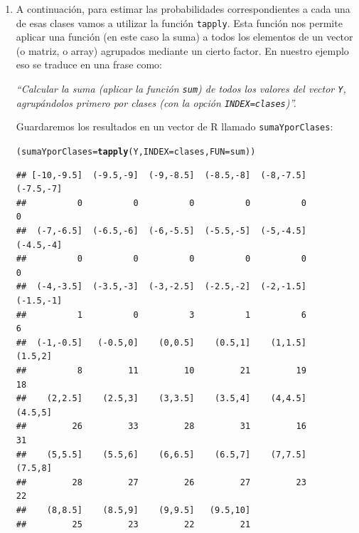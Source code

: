 \documentclass[10pt,a4paper]{article}\usepackage[]{graphicx}\usepackage[]{color}
\makeatletter
\newcommand{\hlstd}[1]{\textcolor[rgb]{0.345,0.345,0.345}{#1}}%
\newcommand{\hlkwb}[1]{\textcolor[rgb]{0.69,0.353,0.396}{#1}}%
\newcommand{\hlkwc}[1]{\textcolor[rgb]{0.333,0.667,0.333}{#1}}%
\newcommand{\hlkwd}[1]{\textcolor[rgb]{0.737,0.353,0.396}{\textbf{#1}}}%
\newenvironment{kframe}{%
 \def\at@end@of@kframe{}%
 \ifinner\ifhmode%
  \def\at@end@of@kframe{\end{minipage}}%
  \begin{minipage}{\columnwidth}%
 \fi\fi%
 \def\FrameCommand##1{\hskip\@totalleftmargin \hskip-\fboxsep
 \colorbox{shadecolor}{##1}\hskip-\fboxsep
     \hskip-\linewidth \hskip-\@totalleftmargin \hskip\columnwidth}%
 \MakeFramed {\advance\hsize-\width
   \@totalleftmargin\z@ \linewidth\hsize
   \@setminipage}}%
 {\par\unskip\endMakeFramed%
 \at@end@of@kframe}
\newenvironment{knitrout}{}{} %
\newcounter {cont01}
\makeatother
\begin{document}
\begin{enumerate}
\item A continuación, para estimar las probabilidades correspondientes a cada una de esas clases vamos a utilizar la función {\tt tapply}. Esta función nos permite aplicar una función (en este caso  la suma) a todos los elementos de un vector (o matriz, o array) agrupados mediante un cierto factor. En nuestro ejemplo eso se traduce en una frase como:

{\em
``Calcular la suma (aplicar la función {\tt sum}) de todos los valores del vector {\tt Y}, agrupándolos primero por clases (con la opción {\tt INDEX=clases})''.
}

Guardaremos los resultados en un vector de R llamado {\tt sumaYporClases}:
\begin{knitrout}
\color{fgcolor}\begin{kframe}
\begin{alltt}
\hlstd{(sumaYporClases} \hlkwb{=} \hlkwd{tapply}\hlstd{(Y,} \hlkwc{INDEX}\hlstd{=clases,} \hlkwc{FUN}\hlstd{=sum))}
\end{alltt}
\begin{verbatim}
## [-10,-9.5]  (-9.5,-9]  (-9,-8.5]  (-8.5,-8]  (-8,-7.5]  (-7.5,-7] 
##          0          0          0          0          0          0 
##  (-7,-6.5]  (-6.5,-6]  (-6,-5.5]  (-5.5,-5]  (-5,-4.5]  (-4.5,-4] 
##          0          0          0          0          0          0 
##  (-4,-3.5]  (-3.5,-3]  (-3,-2.5]  (-2.5,-2]  (-2,-1.5]  (-1.5,-1] 
##          1          0          3          1          6          6 
##  (-1,-0.5]   (-0.5,0]    (0,0.5]    (0.5,1]    (1,1.5]    (1.5,2] 
##          8         11         10         21         19         18 
##    (2,2.5]    (2.5,3]    (3,3.5]    (3.5,4]    (4,4.5]    (4.5,5] 
##         26         33         28         31         16         31 
##    (5,5.5]    (5.5,6]    (6,6.5]    (6.5,7]    (7,7.5]    (7.5,8] 
##         28         27         26         27         23         22 
##    (8,8.5]    (8.5,9]    (9,9.5]   (9.5,10] 
##         25         23         22         21
\end{verbatim}
\end{kframe}
\end{knitrout}


\end{enumerate}
\end{document}
